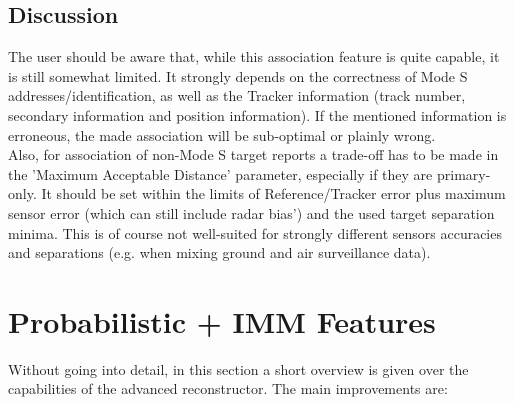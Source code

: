 \begin{itemize}
\subsection{Discussion}

The user should be aware that, while this association feature is quite capable, it is still somewhat limited. It strongly depends on the correctness of Mode S addresses/identification, as well as the Tracker information (track number, secondary information and position information). If the mentioned information is erroneous, the made association will be sub-optimal or plainly wrong. \\

Also, for association of non-Mode S target reports a trade-off has to be made in the 'Maximum Acceptable Distance' parameter, especially if they are primary-only. It should be set within the limits of Reference/Tracker error plus maximum sensor error (which can still include radar bias') and the used target separation minima. This is of course not well-suited for strongly different sensors accuracies and separations (e.g. when mixing ground and air surveillance data). \\

\section{Probabilistic + IMM Features}

Without going into detail, in this section a short overview is given over the capabilities of the advanced reconstructor. The main improvements are:


\end{itemize}
